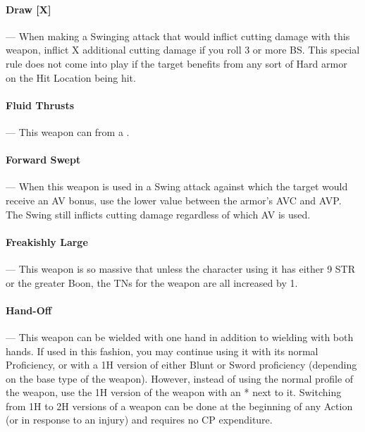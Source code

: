 \documentclass[oneside,11pt,english]{book}
\begin{document}
\vspace{-5pt}\paragraph[Draw]{\label{wepqual:Draw}Draw [X]}---\quad
When making a Swinging attack that would inflict cutting damage with this weapon, inflict X additional cutting damage if you roll 3 or more BS. This special rule does not come into play if the target benefits from any sort of Hard armor on the Hit Location being hit.

\vspace{-5pt}\paragraph{\label{wepqual:Fluid Thrusts}Fluid Thrusts}---\quad
This weapon can  from a .

\vspace{-5pt}\paragraph{\label{wepqual:Forward Swept}Forward Swept}---\quad
When this weapon is used in a Swing attack against which the target would receive an AV bonus, use the lower value between the armor’s AVC and AVP. The Swing still inflicts cutting damage regardless of which AV is used.

\vspace{-5pt}\paragraph{\label{wepqual:Freakishly Large}Freakishly Large}---\quad
This weapon is so massive that unless the character using it has either 9 STR or the greater  Boon, the TNs for the weapon are all increased by 1.

\vspace{-5pt}\paragraph{\label{wepqual:Hand-Off}Hand-Off}---\quad
This weapon can be wielded with one hand in addition to wielding with both hands. If used in this fashion, you may continue using it with its normal Proficiency, or with a 1H version of either Blunt or Sword proficiency (depending on the base type of the weapon). However, instead of using the normal profile of the weapon, use the 1H version of the weapon with an * next to it. Switching from 1H to 2H versions of a weapon can be done at the beginning of any Action (or in response to an injury) and requires no CP expenditure.
\end{document}
